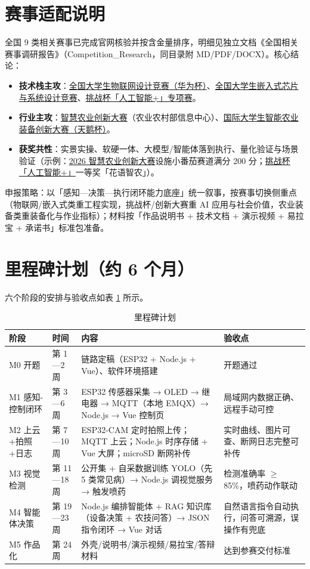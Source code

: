 ﻿\documentclass[11pt]{ctexart}
\begin{document}
\section{赛事适配说明}
全国 9 类相关赛事已完成官网核验并按含金量排序，明细见独立文档《全国相关赛事调研报告》（Competition\_Research，同目录附 MD/PDF/DOCX）。核心结论：
\begin{itemize}
  \item \textbf{技术栈主攻}：\href{https://iot.sjtu.edu.cn}{全国大学生物联网设计竞赛（华为杯）}、\href{https://www.socchina.net}{全国大学生嵌入式芯片与系统设计竞赛}、\href{https://www.tiaozhanbei.net}{挑战杯「人工智能+」专项赛}。
  \item \textbf{行业主攻}：\href{https://www.moa.gov.cn/xw/bmdt/202605/t20260520_6484332.htm}{智慧农业创新大赛}（农业农村部信息中心）、\href{http://uiaec.ujs.edu.cn}{国际大学生智能农业装备创新大赛（天鹅杯）}。
  \item \textbf{获奖共性}：实景实操、软硬一体、大模型/智能体落到执行、量化验证与场景验证（示例：\href{https://www.moa.gov.cn/xw/bmdt/202605/t20260520_6484332.htm}{2026 智慧农业创新大赛}设施小番茄赛道满分 200 分；\href{https://www.tiaozhanbei.net}{挑战杯「人工智能+」}一等奖「花语智农」）。
\end{itemize}
申报策略：以「感知—决策—执行闭环能力底座」统一叙事，按赛事切换侧重点（物联网/嵌入式类重工程实现，挑战杯/创新大赛重 AI 应用与社会价值，农业装备类重装备化与作业指标）；材料按「作品说明书 + 技术文档 + 演示视频 + 易拉宝 + 承诺书」标准包准备。
\section{里程碑计划（约 6 个月）}
六个阶段的安排与验收点如表 \ref{tab:milestone} 所示。
\begin{longtable}{p{2.2cm}p{1.7cm}p{6.5cm}p{4.0cm}}
  \caption{里程碑计划}\label{tab:milestone}\\
  \toprule
  阶段 & 时间 & 内容 & 验收点 \\
  \midrule
  M0 开题 & 第 1—2 周 & 链路定稿（ESP32 + Node.js + Vue）、软件环境搭建 & 开题通过 \\
  M1 感知-控制闭环 & 第 3—6 周 & ESP32 传感器采集 → OLED → 继电器 → MQTT（本地 EMQX）→ Node.js → Vue 控制页 & 局域网内数据正确、远程手动可控 \\
  M2 上云+拍照+日志 & 第 7—10 周 & ESP32-CAM 定时拍照上传；MQTT 上云；Node.js 时序存储 + Vue 大屏；microSD 断网补传 & 实时曲线、图片可查、断网日志完整可补传 \\
  M3 视觉检测 & 第 11—18 周 & 公开集 + 自采数据训练 YOLO（先 5 类常见病）→ Node.js 调视觉服务 → 触发喷药 & 检测准确率 $\geq$ 85\%，喷药动作联动 \\
  M4 智能体决策 & 第 19—23 周 & Node.js 编排智能体 + RAG 知识库（设备决策 + 农技问答）→ JSON 指令闭环 → Vue 对话 & 自然语言指令自动执行，问答可溯源，误操作有兜底 \\
  M5 作品化 & 第 24 周 & 外壳/说明书/演示视频/易拉宝/答辩材料 & 达到参赛交付标准 \\
  \bottomrule
\end{longtable}
\end{document}

